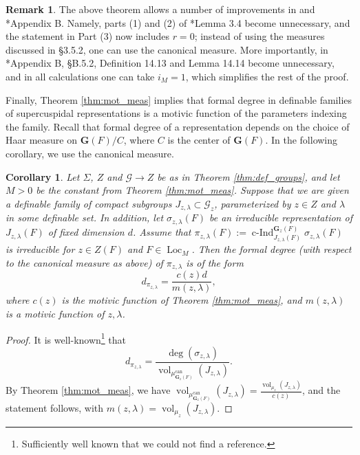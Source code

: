 \documentclass{amsart}
\newcommand{\cG}{\mathcal{G}}
\DeclareMathOperator{\vol}{vol}
\DeclareMathOperator{\loc}{Loc}
\DeclareMathOperator{\ind}{c-Ind}
\newcommand{\bG}{\mathbf{G}}
\newcommand{\can}{\mathrm{can}}
\theoremstyle{plain}
\newtheorem{cor}[thm]{Corollary}
\theoremstyle{definition}
\newtheorem{rem}[thm]{Remark}
\begin{document}
\begin{rem} The above theorem allows a number of improvements in \cite{cluckers-gordon-halupczok:14b} and 
\cite{shin-templier:15a}*{Appendix B}. 
Namely,  parts (1) and (2) of \cite{cluckers-gordon-halupczok:14b}*{Lemma 3.4} become unnecessary, and the statement in Part (3)
now includes $r=0$; instead of using the measures discussed in \S 3.5.2, one can use the canonical measure. 
More importantly, in \cite{shin-templier:15a}*{Appendix B, \S B.5.2}, Definition 14.13 and Lemma 14.14
become unnecessary, and in all calculations one can take $i_M=1$, which simplifies the rest of the proof.
\end{rem}




Finally, Theorem \ref{thm:mot_meas} implies that formal degree in definable families of
supercuspidal representations is a motivic function of the parameters indexing the family. 
Recall that formal degree of a representation depends on the choice of Haar measure on 
$\bG(F)/C$, where $C$ is the center of $\bG(F)$. 
In the following corollary, we use the canonical measure. 
 
\begin{cor} Let $\Sigma$, $Z$  and $\cG \to Z$ be as in Theorem \ref{thm:def_groups}, and let $M>0$ be the constant from Theorem \ref{thm:mot_meas}.
Suppose that we are given a definable family of compact subgroups $J_{z, \lambda} \subset \cG_z$,
parameterized by $z \in Z$ and $\lambda$ in some definable set.
In addition, let $\sigma_{z, \lambda}(F)$ be an irreducible representation of $J_{z, \lambda}(F)$ of fixed dimension $d$.
Assume that $\pi_{z,\lambda}(F) := \ind_{J_{z,\lambda}(F)}^{\bG_z(F)} \sigma_{z,\lambda}(F)$
is irreducible for $z \in Z(F)$ and $F \in \loc_M$.
Then the formal degree (with respect to the canonical measure as above) of $\pi_{z, \lambda}$ is of the form 
\[
d_{\pi_{z, \lambda}}=\frac{c(z)d}{m(z, \lambda)},
\]
where $c(z)$ is the motivic function of Theorem \ref{thm:mot_meas}, and $m(z, \lambda)$ is a motivic function of $z, \lambda$. 
\end{cor}
\begin{proof}
It is well-known\footnote{Sufficiently well known that we could not find a reference.} that
\[
d_{\pi_{z, \lambda}}=\frac{\deg(\sigma_{z, \lambda})}{\vol_{\mu_{\bG_z(F)}^\can}(J_{z, \lambda})}.
\]
By Theorem \ref{thm:mot_meas}, we have 
$\vol_{\mu_{\bG_z(F)}^\can}(J_{z, \lambda}) = \frac{\vol_{\mu_z}(J_{z, \lambda})}{c(z)}$,
and the statement follows, with $m(z, \lambda)=\vol_{\mu_z}(J_{z, \lambda})$.
\end{proof}
\end{document}
